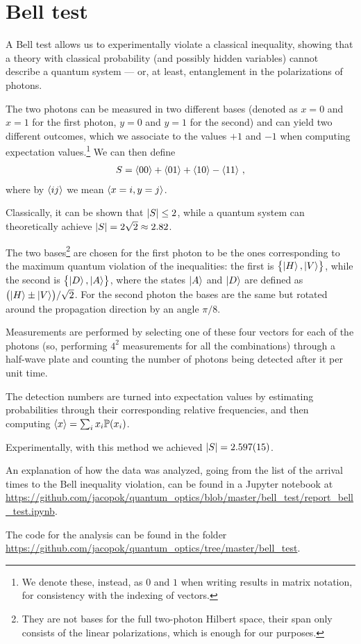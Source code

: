 \documentclass[main.tex]{subfiles}
\begin{document}
\section{Bell test}

A Bell test allows us to experimentally violate a classical inequality, showing that a theory with classical probability (and possibly hidden variables) cannot describe a quantum system --- or, at least, entanglement in the polarizations of photons. 

The two photons can be measured in two different bases (denoted as \(x=0\) and \(x=1\) for the first photon, \(y=0\) and \(y=1\) for the second) and can yield two different outcomes, which we associate to the values \(+1\) and \(-1\) when computing expectation values.\footnote{We denote these, instead, as \(0\) and \(1\) when writing results in matrix notation, for consistency with the indexing of vectors.} We can then define 
%
\begin{align}
S = \expval{00} + \expval{01}+ \expval{10} - \expval{11}
\,,
\end{align}
%
where by \(\expval{ij}\) we mean \(\expval{x=i, y=j}\). 

Classically, it can be shown \cite[]{clauserProposedExperimentTest1969} that \(\abs{S} \leq 2\), while a quantum system can theoretically achieve \(\abs{S} = 2 \sqrt{2} \approx \num{2.82}\). 

The two bases\footnote{They are not bases for the full two-photon Hilbert space, their span only consists of the linear polarizations, which is enough for our purposes. } are chosen for the first photon to be the ones corresponding to the maximum quantum violation of the inequalities: the first is \(\qty{\ket{H}, \ket{V}}\), while the second is \(\qty{\ket{D}, \ket{A}}\), where the states \(\ket{A}\) and \(\ket{D}\) are defined as \(\qty(\ket{H} \pm \ket{V}) / \sqrt{2}\).
For the second photon the bases are the same but rotated around the propagation direction by an angle \(\pi /8\).

Measurements are performed by selecting one of these four vectors for each of the photons (so, performing \(4^2\) measurements for all the combinations) through a half-wave plate and counting the number of photons being detected after it per unit time. 

The detection numbers are turned into expectation values by estimating probabilities through their corresponding relative frequencies, and then computing \(\expval{x} = \sum_i x_i \mathbb{P}(x_i)\). 

Experimentally, with this method we achieved \(\abs{S} = \num{2.597(15)}\).

An explanation of how the data was analyzed, going from the list of the arrival times to the Bell inequality violation, can be found in a Jupyter notebook at \url{https://github.com/jacopok/quantum_optics/blob/master/bell_test/report_bell_test.ipynb}.

The code for the analysis can be found in the folder \url{https://github.com/jacopok/quantum_optics/tree/master/bell_test}. 
\end{document}
